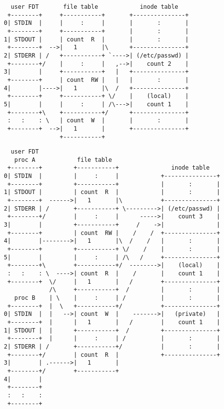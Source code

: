 \documentclass[varwidth,crop,multi={verbatim}]{standalone}
\begin{document}
\begin{verbatim}
  user FDT       file table            inode table
 +--------+     +-----------+       +---------------+
0| STDIN  |     |     :     |       |       :       |
 +--------+     +-----------+       |       :       |
1| STDOUT |     | count  R  |       |       :       |
 +--------+  -->|   1       |\      +---------------+
2| STDERR | /   +-----------+ `---->| (/etc/passwd) |
 +--------+/    |     :     |   ,-->|    count 2    |
3|        |     +-----------+   |   +---------------+
 +--------+     | count  RW |   |   |       :       |
4|        |---->|   1       |\  /   +---------------+
 +--------+     +-----------+ \/    |    (local)    |
5|        |     |     :     | /\--->|    count 1    |
 +--------+\    +-----------+/      +---------------+
 :   :    : \   | count  W  |       |       :       |
 +--------+  -->|   1       |       +---------------+
                +-----------+
\end{verbatim}

\begin{verbatim}
  user FDT
   proc A            file table
 +--------+         +-----------+               inode table
0| STDIN  |         |     :     |            +---------------+
 +--------+         +-----------+            |       :       |
1| STDOUT |         | count  R  |            |       :       |
 +--------+  ------>|   1       |\           +---------------+
2| STDERR | /       +-----------+ \--------->| (/etc/passwd) |
 +--------+/        |     :     |      ----->|    count 3    |
3|        |         +-----------+     /    ->|               |
 +--------+         | count  RW |    /    /  +---------------+
4|        |-------->|   1       |\  /    /   |       :       |
 +--------+         +-----------+ \/    /    |       :       |
5|        |         |     :     | /\   /     +---------------+
 +--------+\        +-----------+/  -------->|    (local)    |
 :   :    : \  ---->| count  R  |    /       |    count 1    |
 +--------+  \/     |   1       |   /        +---------------+
             /\     +-----------+  /         |       :       |
   proc B    | \    |     :     | /          |       :       |
 +--------+  |  \   +-----------+/           +---------------+
0| STDIN  |  |   -->| count  W  |    ------->|   (private)   |
 +--------+  |      |   1       |   /        |    count 1    |
1| STDOUT |  |      +-----------+  /         +---------------+
 +--------+  |      |     :     | /          |       :       |
2| STDERR | /       +-----------+/           |       :       |
 +--------+/        | count  R  |            +---------------+
3|        | .------>|   1       |
 +--------+/        +-----------+
4|        |
 +--------+
 :   :    :
 +--------+
\end{verbatim}
\end{document}
